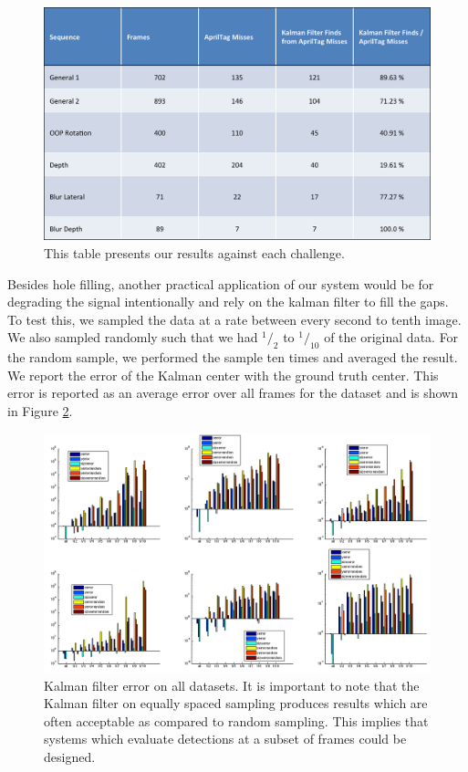 \documentclass[letterpaper,10pt,conference]{IEEEtran}
\begin{document}
\begin{figure}
\centering
\includegraphics[scale=.4]{table2}
\caption{This table presents our results against each challenge.}
\label{fig:table2}
\end{figure}

Besides hole filling, another practical application of our system would be for degrading the signal intentionally and rely on the kalman filter to fill the gaps. To test this, we sampled the data at a rate between every second to tenth image.  We also sampled randomly such that we had $^1/_2$ to $^1/_{10}$ of the original data.  For the random sample, we performed the sample ten times and averaged the result. We report the error of the Kalman center with the ground truth center.  This error is reported as an average error over all frames for the dataset and is shown in Figure \ref{fig:kalman_error}.

\begin{figure}
\includegraphics[scale=.3]{kalman}
\caption{Kalman filter error on all datasets.  It is important to note that the Kalman filter on equally spaced sampling produces results which are often acceptable as compared to random sampling. This implies that systems which evaluate detections at a subset of frames could be designed.}
\label{fig:kalman_error}
\end{figure}
\end{document}
